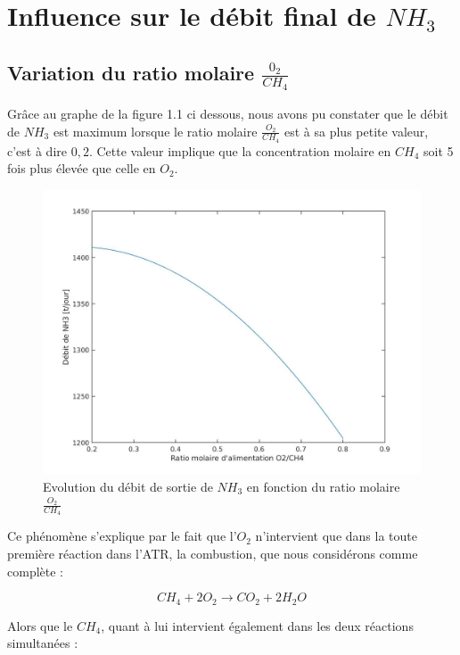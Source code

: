 \documentclass[12pt]{report}
\begin{document}
\section{Influence sur le débit final de $NH_3$}


\subsection{Variation du ratio molaire $\frac{0_2}{CH_4}$}

Grâce au graphe de la figure 1.1 ci dessous, nous avons pu constater que le débit de $NH_3$ est maximum lorsque le ratio molaire $\frac{O_2}{CH_4}$ est à sa plus petite valeur, c'est à dire $0,2$. Cette valeur implique que la concentration molaire en $CH_4$ soit 5 fois plus élevée que celle en $O_2$.

\begin{figure}[H]
\begin{center}
\includegraphics[scale=0.3]{debit_NH3_ratio_O2}
\caption{Evolution du débit de sortie de $NH_3$ en fonction du ratio molaire $\frac{O_2}{CH_4}$}
\end{center}
\end{figure}

Ce phénomène s'explique par le fait que l'$O_2$ n'intervient que dans la toute première réaction dans l'ATR, la combustion, que nous considérons comme complète :

\begin{equation}
 CH_4 + 2O_2 \rightarrow CO_2 + 2H_2O
\end{equation}

 
 Alors que le $CH_4$, quant à lui intervient également dans les deux réactions simultanées :
 
\end{document}
